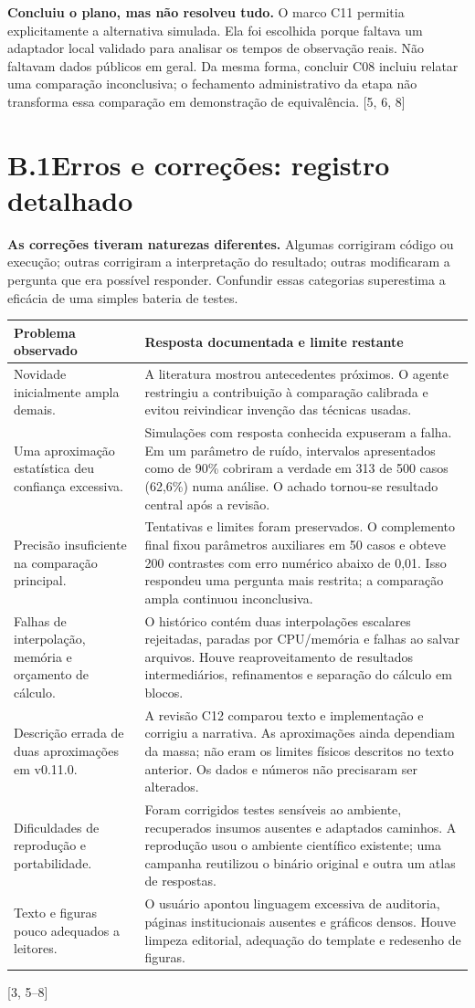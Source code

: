 \documentclass[11pt,a4paper]{article}
\newcommand{\fonte}[1]{{\small\color{navy}[#1]}}
\newcommand{\titulo}[2]{\section*{\color{navy}#1\quad #2}}
\begin{document}
\textbf{Concluiu o plano, mas não resolveu tudo.} O marco C11 permitia explicitamente a alternativa simulada. Ela foi escolhida porque faltava um adaptador local validado para analisar os tempos de observação reais. Não faltavam dados públicos em geral. Da mesma forma, concluir C08 incluiu relatar uma comparação inconclusiva; o fechamento administrativo da etapa não transforma essa comparação em demonstração de equivalência. \fonte{5, 6, 8}
\newpage

\titulo{B.1}{Erros e correções: registro detalhado}
\textbf{As correções tiveram naturezas diferentes.} Algumas corrigiram código ou execução; outras corrigiram a interpretação do resultado; outras modificaram a pergunta que era possível responder. Confundir essas categorias superestima a eficácia de uma simples bateria de testes.

\begin{tabularx}{\textwidth}{@{}Y Y@{}}
\toprule
\textbf{Problema observado} & \textbf{Resposta documentada e limite restante}\\
\midrule
Novidade inicialmente ampla demais. & A literatura mostrou antecedentes próximos. O agente restringiu a contribuição à comparação calibrada e evitou reivindicar invenção das técnicas usadas.\\
Uma aproximação estatística deu confiança excessiva. & Simulações com resposta conhecida expuseram a falha. Em um parâmetro de ruído, intervalos apresentados como de 90\% cobriram a verdade em 313 de 500 casos (62,6\%) numa análise. O achado tornou-se resultado central após a revisão.\\
Precisão insuficiente na comparação principal. & Tentativas e limites foram preservados. O complemento final fixou parâmetros auxiliares em 50 casos e obteve 200 contrastes com erro numérico abaixo de 0,01. Isso respondeu uma pergunta mais restrita; a comparação ampla continuou inconclusiva.\\
Falhas de interpolação, memória e orçamento de cálculo. & O histórico contém duas interpolações escalares rejeitadas, paradas por CPU/memória e falhas ao salvar arquivos. Houve reaproveitamento de resultados intermediários, refinamentos e separação do cálculo em blocos.\\
Descrição errada de duas aproximações em v0.11.0. & A revisão C12 comparou texto e implementação e corrigiu a narrativa. As aproximações ainda dependiam da massa; não eram os limites físicos descritos no texto anterior. Os dados e números não precisaram ser alterados.\\
Dificuldades de reprodução e portabilidade. & Foram corrigidos testes sensíveis ao ambiente, recuperados insumos ausentes e adaptados caminhos. A reprodução usou o ambiente científico existente; uma campanha reutilizou o binário original e outra um atlas de respostas.\\
Texto e figuras pouco adequados a leitores. & O usuário apontou linguagem excessiva de auditoria, páginas institucionais ausentes e gráficos densos. Houve limpeza editorial, adequação do template e redesenho de figuras.\\
\bottomrule
\end{tabularx}
\fonte{3, 5--8}
\end{document}
